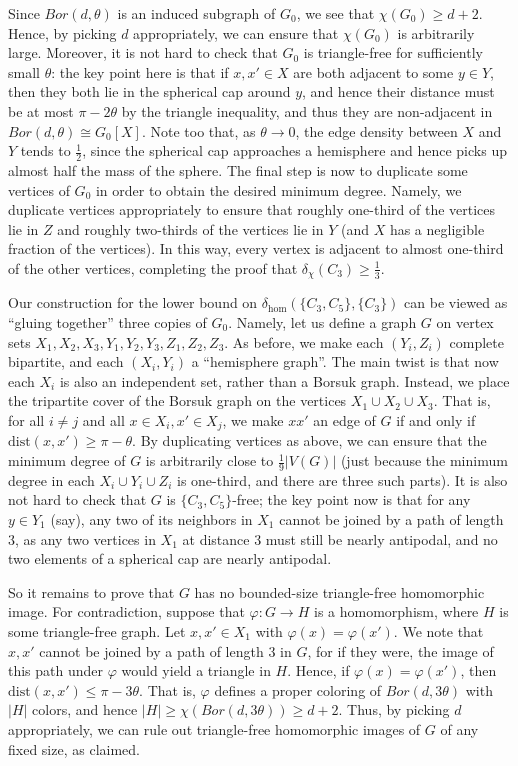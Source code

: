 \documentclass{article}
\newcommand{\dist}{\text{dist}}
\begin{document}
Since $Bor(d,\theta)$ is an induced subgraph of $G_0$, we see that $\chi(G_0)\geq d+2$. Hence, by picking $d$ appropriately, we can ensure that $\chi(G_0)$ is arbitrarily large. Moreover, it is not hard to check that $G_0$ is triangle-free for sufficiently small $\theta$: the key point here is that if $x,x' \in X$ are both adjacent to some $y \in Y$, then they both lie in the spherical cap around $y$, and hence their distance must be at most $\pi-2\theta$ by the triangle inequality, and thus they are non-adjacent in $Bor(d,\theta)\cong G_0[X]$. Note too that, as $\theta\to 0$, the edge density between $X$ and $Y$ tends to $\frac 12$, since the spherical cap approaches a hemisphere and hence picks up almost half the mass of the sphere. The final step is now to duplicate some vertices of $G_0$ in order to obtain the desired minimum degree. Namely, we duplicate vertices appropriately to ensure that roughly one-third of the vertices lie in $Z$ and roughly two-thirds of the vertices lie in $Y$ (and $X$ has a negligible fraction of the vertices). In this way, every vertex is adjacent to almost one-third of the other vertices, completing the proof that $\delta_\chi(C_3)\geq \frac 13$. 

Our construction for the lower bound on $\delta_{\hom}(\{C_3,C_5\},\{C_3\})$ can be viewed as ``gluing together'' three copies of $G_0$. Namely, let us define a graph $G$ on vertex sets $X_1,X_2,X_3,Y_1,Y_2,Y_3,Z_1,Z_2,Z_3$. As before, we make each $(Y_i,Z_i)$ complete bipartite, and each $(X_i,Y_i)$ a ``hemisphere graph''. The main twist is that now each $X_i$ is also an independent set, rather than a Borsuk graph. Instead, we place the tripartite cover of the Borsuk graph on the vertices $X_1 \cup X_2 \cup X_3$. That is, for all $i \neq j$ and all $x \in X_i, x' \in X_j$, we make $xx'$ an edge of $G$ if and only if $\dist(x,x')\geq \pi-\theta$. By duplicating vertices as above, we can ensure that the minimum degree of $G$ is arbitrarily close to $\frac 19 |V(G)|$ (just because the minimum degree in each $X_i \cup Y_i \cup Z_i$ is one-third, and there are three such parts). It is also not hard to check that $G$ is $\{C_3,C_5\}$-free; the key point now is that for any $y \in Y_1$ (say), any two of its neighbors in $X_1$ cannot be joined by a path of length $3$, as any two vertices in $X_1$ at distance $3$ must still be nearly antipodal, and no two elements of a spherical cap are nearly antipodal.

So it remains to prove that $G$ has no bounded-size triangle-free homomorphic image. For contradiction, suppose that $\varphi:G \to H$ is a homomorphism, where $H$ is some triangle-free graph. Let $x,x' \in X_1$ with $\varphi(x)=\varphi(x')$. We note that $x,x'$ cannot be joined by a path of length $3$ in $G$, for if they were, the image of this path under $\varphi$ would yield a triangle in $H$. Hence, if $\varphi(x)=\varphi(x')$, then $\dist(x,x')\leq \pi-3\theta$. That is, $\varphi$ defines a proper coloring of $Bor(d,3\theta)$ with $|H|$ colors, and hence $|H|\geq \chi(Bor(d,3\theta))\geq d+2$. Thus, by picking $d$ appropriately, we can rule out triangle-free homomorphic images of $G$ of any fixed size, as claimed.
\end{document}
